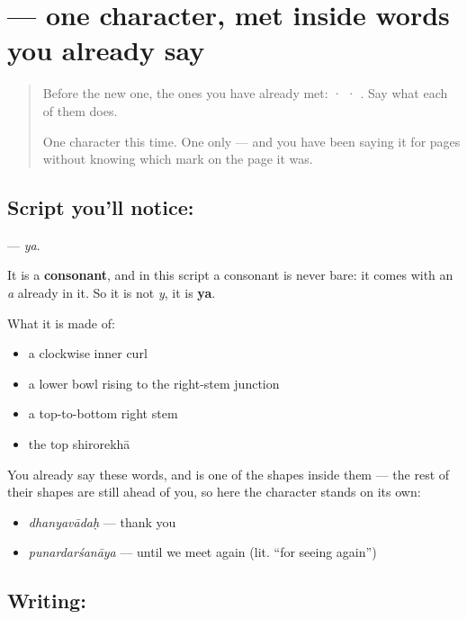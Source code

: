 \section[\texorpdfstring{\sk{य} (ya)}{य (ya)}]{ — one character, met inside words you already say}

\label{lesson:SA-S204-letter-ya}



\begin{quote}
Before the new one, the ones you have already met:  ·  · . Say what each of them does.

One character this time. One only — and you have been saying it for pages without knowing which mark on the page it was.
\end{quote}

\subsection*{Script you'll notice: }
\textbf{} — \emph{ya}.

It is a \textbf{consonant}, and in this script a consonant is never bare: it comes with an \emph{a} already in it. So it is not \emph{y}, it is \textbf{ya}.

What it is made of:

\begin{itemize}
\raggedright
  \item a clockwise inner curl
  \item a lower bowl rising to the right-stem junction
  \item a top-to-bottom right stem
  \item the top shirorekhā
\end{itemize}

You already say these words, and  is one of the shapes inside them — the rest of their shapes are still ahead of you, so here the character stands on its own:

\begin{itemize}
\raggedright
  \item \emph{dhanyavādaḥ} — thank you
  \item \emph{punardarśanāya} — until we meet again (lit. \textquotedblleft{}for seeing again\textquotedblright{})
\end{itemize}

\subsection*{Writing: }

